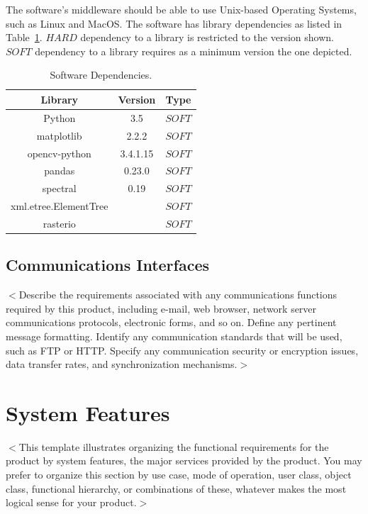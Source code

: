 \documentclass{scrreprt}
\begin{document}
The software's middleware should be able to use Unix-based Operating Systems, such as 
Linux and MacOS. The software has library dependencies as listed in Table~\ref{tab:software_dependencies}.
$HARD$ dependency to a library is restricted to the version shown.
$SOFT$ dependency to a library requires as a minimum version the one depicted.


\begin{table}
	\centering
	\begin{tabular}{|c|c|c|}
		\hline
		Library & Version & Type\\\hline
		Python & 3.5 & $SOFT$\\\hline
		matplotlib    & 2.2.2 & $SOFT$ \\\hline
		opencv-python & 3.4.1.15 & $SOFT$ \\\hline
		pandas        & 0.23.0 & $SOFT$ \\\hline
		spectral      & 0.19 & $SOFT$ \\\hline
		xml.etree.ElementTree      &  & $SOFT$ \\\hline
		rasterio  &  & $SOFT$ \\\hline
		\hline
	\end{tabular}
	\caption{Software Dependencies.\label{tab:software_dependencies}}
\end{table}


\section{Communications Interfaces}
$<$Describe the requirements associated with any communications functions 
required by this product, including e-mail, web browser, network server 
communications protocols, electronic forms, and so on. Define any pertinent 
message formatting. Identify any communication standards that will be used, such 
as FTP or HTTP. Specify any communication security or encryption issues, data 
transfer rates, and synchronization mechanisms.$>$


\chapter{System Features}
$<$This template illustrates organizing the functional requirements for the 
product by system features, the major services provided by the product. You may 
prefer to organize this section by use case, mode of operation, user class, 
object class, functional hierarchy, or combinations of these, whatever makes the 
most logical sense for your product.$>$
\end{document}
